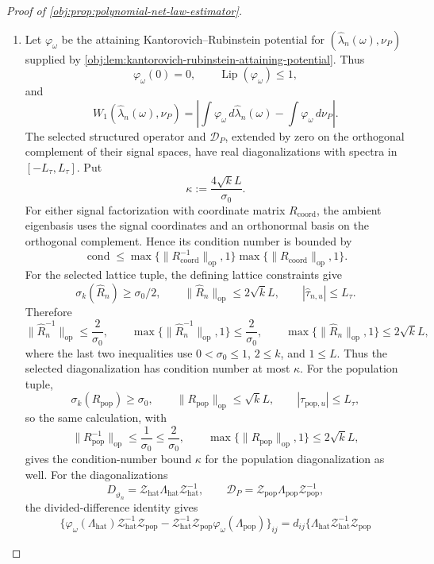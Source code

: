 \documentclass[11pt]{article}
\begin{document}
\begin{proof}[Proof of \cref{obj:prop:polynomial-net-law-estimator}]
\begin{enumerate}
\item Let \(\varphi_\omega\) be the attaining Kantorovich--Rubinstein potential for
\((\widehat\lambda_n(\omega),\nu_P)\) supplied by
\cref{obj:lem:kantorovich-rubinstein-attaining-potential}.  Thus
\[
\varphi_\omega(0)=0,\qquad \operatorname{Lip}(\varphi_\omega)\le1,
\]
and
\[
W_1(\widehat\lambda_n(\omega),\nu_P)
=
\left|
\int\varphi_\omega\,d\widehat\lambda_n(\omega)
-
\int\varphi_\omega\,d\nu_P
\right|.
\]
The selected structured operator and \(\mathcal D_P\), extended by zero on the orthogonal complement of their signal spaces, have real diagonalizations with spectra in \([-L_\tau,L_\tau]\).  Put
\[
\kappa:=\frac{4\sqrt{k}L}{\sigma_0}.
\]
For either signal factorization with coordinate matrix \(R_{\mathrm{coord}}\), the ambient eigenbasis uses the signal coordinates and an orthonormal basis on the orthogonal complement.  Hence its condition number is bounded by
\[
\operatorname{cond}\le
\max\{\|R_{\mathrm{coord}}^{-1}\|_{\mathrm{op}},1\}
\max\{\|R_{\mathrm{coord}}\|_{\mathrm{op}},1\}.
\]
For the selected lattice tuple, the defining lattice constraints give
\[
\sigma_k(\widehat R_n)\ge\sigma_0/2,
\qquad
\|\widehat R_n\|_{\mathrm{op}}\le2\sqrt{k}L,
\qquad
|\widehat\tau_{n,u}|\le L_\tau .
\]
Therefore
\[
\|\widehat R_n^{-1}\|_{\mathrm{op}}\le\frac{2}{\sigma_0},
\qquad
\max\{\|\widehat R_n^{-1}\|_{\mathrm{op}},1\}\le\frac{2}{\sigma_0},
\qquad
\max\{\|\widehat R_n\|_{\mathrm{op}},1\}\le2\sqrt{k}L,
\]
where the last two inequalities use \(0<\sigma_0\le1\), \(2\le k\), and \(1\le L\).  Thus the selected diagonalization has condition number at most \(\kappa\).  For the population tuple,
\[
\sigma_k(R_{\mathrm{pop}})\ge\sigma_0,
\qquad
\|R_{\mathrm{pop}}\|_{\mathrm{op}}\le\sqrt{k}L,
\qquad
|\tau_{\mathrm{pop},u}|\le L_\tau,
\]
so the same calculation, with
\[
\|R_{\mathrm{pop}}^{-1}\|_{\mathrm{op}}\le\frac1{\sigma_0}\le\frac2{\sigma_0},
\qquad
\max\{\|R_{\mathrm{pop}}\|_{\mathrm{op}},1\}\le2\sqrt{k}L,
\]
gives the condition-number bound \(\kappa\) for the population diagonalization as well.
For the diagonalizations
\[
D_{\widehat\vartheta_n}=\mathcal Z_{\mathrm{hat}}\Lambda_{\mathrm{hat}}\mathcal Z_{\mathrm{hat}}^{-1},
\qquad
\mathcal D_P=\mathcal Z_{\mathrm{pop}}\Lambda_{\mathrm{pop}}\mathcal Z_{\mathrm{pop}}^{-1},
\]
the divided-difference identity gives
\[
\{\varphi_\omega(\Lambda_{\mathrm{hat}})\mathcal Z_{\mathrm{hat}}^{-1}\mathcal Z_{\mathrm{pop}}
-\mathcal Z_{\mathrm{hat}}^{-1}\mathcal Z_{\mathrm{pop}}\varphi_\omega(\Lambda_{\mathrm{pop}})\}_{ij}
=
d_{ij}\{\Lambda_{\mathrm{hat}}\mathcal Z_{\mathrm{hat}}^{-1}\mathcal Z_{\mathrm{pop}}
\]
\end{enumerate}
\end{proof}
\end{document}
